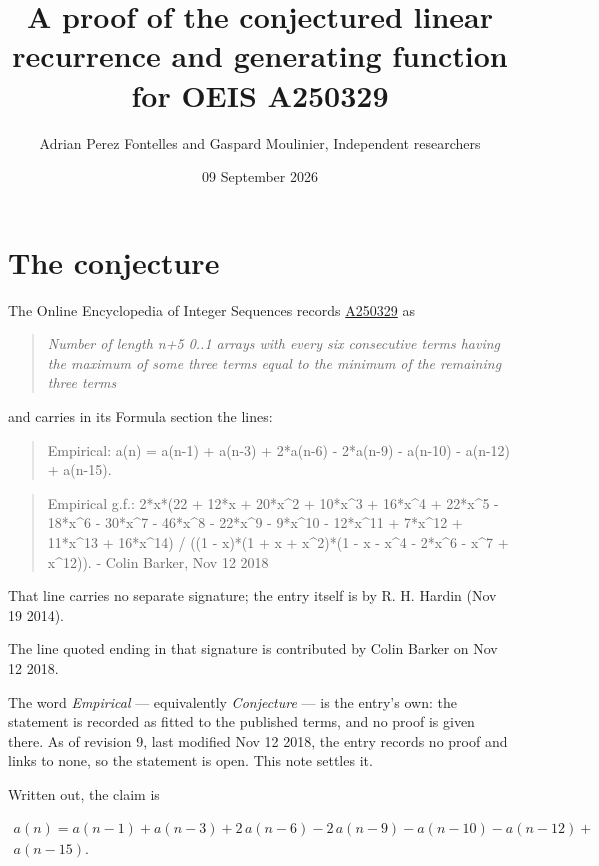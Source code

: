 \documentclass[11pt]{article}
\title{A proof of the conjectured linear recurrence and generating function for OEIS A250329}
\author{Adrian Perez Fontelles and Gaspard Moulinier, Independent researchers}
\date{09 September 2026}
\theoremstyle{definition}
\begin{document}
\maketitle
\section{The conjecture}

The Online Encyclopedia of Integer Sequences records \href{https://oeis.org/A250329}{A250329} as

\begin{quote}\itshape Number of length n+5 0..1 arrays with every six consecutive terms having the maximum of some three terms equal to the minimum of the remaining three terms\end{quote}

and carries in its Formula section the lines:

\begin{quote}\ttfamily Empirical: a(n) = a(n-1) + a(n-3) + 2*a(n-6) - 2*a(n-9) - a(n-10) - a(n-12) + a(n-15).\end{quote}

\begin{quote}\ttfamily Empirical g.f.: 2*x*(22 + 12*x + 20*x\textasciicircum{}2 + 10*x\textasciicircum{}3 + 16*x\textasciicircum{}4 + 22*x\textasciicircum{}5 - 18*x\textasciicircum{}6 - 30*x\textasciicircum{}7 - 46*x\textasciicircum{}8 - 22*x\textasciicircum{}9 - 9*x\textasciicircum{}10 - 12*x\textasciicircum{}11 + 7*x\textasciicircum{}12 + 11*x\textasciicircum{}13 + 16*x\textasciicircum{}14) / ((1 - x)*(1 + x + x\textasciicircum{}2)*(1 - x - x\textasciicircum{}4 - 2*x\textasciicircum{}6 - x\textasciicircum{}7 + x\textasciicircum{}12)). - Colin Barker, Nov 12 2018\end{quote}

That line carries no separate signature; the entry itself is by R. H. Hardin (Nov 19 2014).

The line quoted ending in that signature is contributed by Colin Barker on Nov 12 2018.

The word {\itshape Empirical} --- equivalently {\itshape Conjecture} --- is the entry's own: the statement is recorded as fitted to the published terms, and no proof is given there. As of revision 9, last modified Nov 12 2018, the entry records no proof and links to none, so the statement is open. This note settles it.

Written out, the claim is

\begin{multline*} a(n) = a(n-1) + a(n-3) + 2\,a(n-6) - 2\,a(n-9) - a(n-10) - a(n-12) + \\ a(n-15). \end{multline*}
\end{document}
